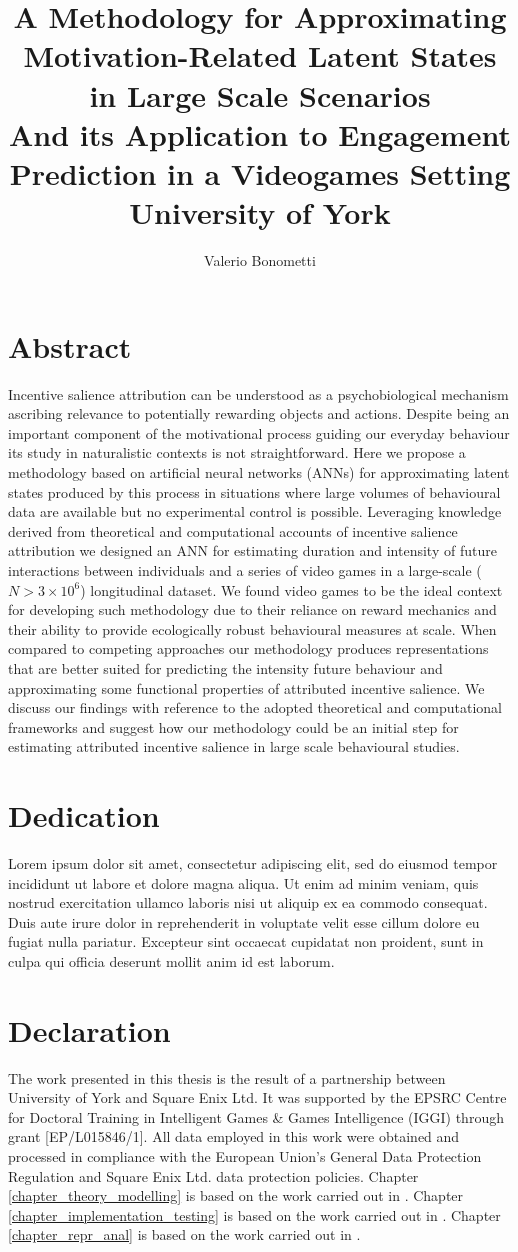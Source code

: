 \documentclass{yorkThesis}
\title{
{A Methodology for Approximating Motivation-Related Latent States in Large Scale Scenarios}\\
{\small And its Application to Engagement Prediction in a Videogames Setting}\\

{\large University of York}
}
\author{Valerio Bonometti}
\newcommand{\lorem}{Lorem ipsum dolor sit amet, consectetur adipiscing elit, sed do eiusmod tempor incididunt ut labore et dolore magna aliqua. Ut enim ad minim veniam, quis nostrud exercitation ullamco laboris nisi ut aliquip ex ea commodo consequat. Duis aute irure dolor in reprehenderit in voluptate velit esse cillum dolore eu fugiat nulla pariatur. Excepteur sint occaecat cupidatat non proident, sunt in culpa qui officia deserunt mollit anim id est laborum.\\}
\begin{document}
\maketitle

\chapter*{Abstract}
Incentive salience attribution can be understood as a psychobiological mechanism ascribing relevance to potentially rewarding objects and actions. Despite being an important component of the motivational process guiding our everyday behaviour its study in naturalistic contexts is not straightforward. Here we propose a methodology based on artificial neural networks (ANNs) for approximating latent states produced by this process in situations where large volumes of behavioural data are available but no experimental control is possible. Leveraging knowledge derived from theoretical and computational accounts of incentive salience attribution we designed an ANN for estimating duration and intensity of future interactions between individuals and a series of video games in a large-scale ($N> 3 \times 10^6$) longitudinal dataset. We found video games to be the ideal context for developing such methodology due to their reliance on reward mechanics and their ability to provide ecologically robust behavioural measures at scale. When compared to competing approaches our methodology produces representations that are better suited for predicting the intensity future behaviour and approximating some functional properties of attributed incentive salience. We discuss our findings with reference to the adopted theoretical and computational frameworks and suggest how our methodology could be an initial step for estimating attributed incentive salience in large scale behavioural studies.

\chapter*{Dedication}
\lorem

\chapter*{Declaration}
The work presented in this thesis is the result of a partnership between University of York and Square Enix Ltd. It was supported by the EPSRC Centre for Doctoral Training in Intelligent Games \& Games Intelligence (IGGI) through grant [EP/L015846/1]. All data employed in this work were obtained and processed in compliance with the European Union's General Data Protection Regulation \cite{EUdataregulations2018} and Square Enix Ltd. data protection policies. Chapter \ref{chapter_theory_modelling} is based on the work carried out in \cite{bonometti2020theory, bonometti2021approximating}. Chapter \ref{chapter_implementation_testing} is based on the work carried out in \cite{bonometti2019modelling, bonometti2020theory, bonometti2021approximating}. Chapter \ref{chapter_repr_anal} is based on the work carried out in \cite{bonometti2021approximating}.
\end{document}
